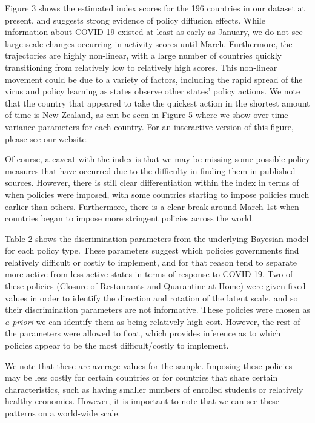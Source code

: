 \documentclass[]{article}
\begin{document}
Figure 3 shows the estimated index scores for the 196 countries in our dataset at present, and suggests strong evidence of policy diffusion effects. While information about COVID-19 existed at least as early as January, we do not see large-scale changes occurring in activity scores until March. Furthermore, the trajectories are highly non-linear, with a large number of countries quickly transitioning from relatively low to relatively high scores. This non-linear movement could be due to a variety of factors, including the rapid spread of the virus and policy learning as states observe other states' policy actions. We note that the country that appeared to take the quickest action in the shortest amount of time is New Zealand, as can be seen in Figure 5 where we show over-time variance parameters for each country. For an interactive version of this figure, please see our website.

Of course, a caveat with the index is that we may be missing some possible policy measures that have occurred due to the difficulty in finding them in published sources. However, there is still clear differentiation within the index in terms of when policies were imposed, with some countries starting to impose policies much earlier than others. Furthermore, there is a clear break around March 1st when countries began to impose more stringent policies across the world.

Table 2 shows the discrimination parameters from the underlying Bayesian model for each policy type. These parameters suggest which policies governments find relatively difficult or costly to implement, and for that reason tend to separate more active from less active states in terms of response to COVID-19. Two of these policies (Closure of Restaurants and Quarantine at Home) were given fixed values in order to identify the direction and rotation of the latent scale, and so their discrimination parameters are not informative. These policies were chosen as \emph{a priori} we can identify them as being relatively high cost. However, the rest of the parameters were allowed to float, which provides inference as to which policies appear to be the most difficult/costly to implement.

We note that these are average values for the sample. Imposing these policies may be less costly for certain countries or for countries that share certain characteristics, such as having smaller numbers of enrolled students or relatively healthy economies. However, it is important to note that we can see these patterns on a world-wide scale.
\end{document}
